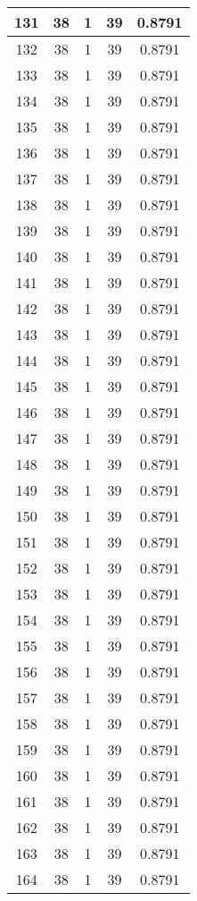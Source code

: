 \documentclass[letterpaper, 12pt]{article}
\begin{document}
\begin{longtable}{|c|c|c|c|c|}
\hline
131 & 38 & 1 & 39 & 0.8791 \\
\hline
132 & 38 & 1 & 39 & 0.8791 \\
\hline
133 & 38 & 1 & 39 & 0.8791 \\
\hline
134 & 38 & 1 & 39 & 0.8791 \\
\hline
135 & 38 & 1 & 39 & 0.8791 \\
\hline
136 & 38 & 1 & 39 & 0.8791 \\
\hline
137 & 38 & 1 & 39 & 0.8791 \\
\hline
138 & 38 & 1 & 39 & 0.8791 \\
\hline
139 & 38 & 1 & 39 & 0.8791 \\
\hline
140 & 38 & 1 & 39 & 0.8791 \\
\hline
141 & 38 & 1 & 39 & 0.8791 \\
\hline
142 & 38 & 1 & 39 & 0.8791 \\
\hline
143 & 38 & 1 & 39 & 0.8791 \\
\hline
144 & 38 & 1 & 39 & 0.8791 \\
\hline
145 & 38 & 1 & 39 & 0.8791 \\
\hline
146 & 38 & 1 & 39 & 0.8791 \\
\hline
147 & 38 & 1 & 39 & 0.8791 \\
\hline
148 & 38 & 1 & 39 & 0.8791 \\
\hline
149 & 38 & 1 & 39 & 0.8791 \\
\hline
150 & 38 & 1 & 39 & 0.8791 \\
\hline
151 & 38 & 1 & 39 & 0.8791 \\
\hline
152 & 38 & 1 & 39 & 0.8791 \\
\hline
153 & 38 & 1 & 39 & 0.8791 \\
\hline
154 & 38 & 1 & 39 & 0.8791 \\
\hline
155 & 38 & 1 & 39 & 0.8791 \\
\hline
156 & 38 & 1 & 39 & 0.8791 \\
\hline
157 & 38 & 1 & 39 & 0.8791 \\
\hline
158 & 38 & 1 & 39 & 0.8791 \\
\hline
159 & 38 & 1 & 39 & 0.8791 \\
\hline
160 & 38 & 1 & 39 & 0.8791 \\
\hline
161 & 38 & 1 & 39 & 0.8791 \\
\hline
162 & 38 & 1 & 39 & 0.8791 \\
\hline
163 & 38 & 1 & 39 & 0.8791 \\
\hline
164 & 38 & 1 & 39 & 0.8791 \\

\end{longtable}
\end{document}
